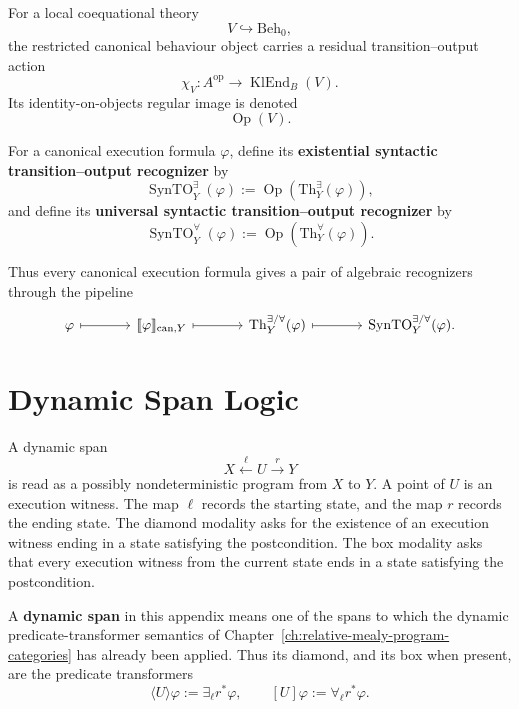 For a local coequational theory
\[
  V\hookrightarrow \mathrm{Beh}_0,
\]
the restricted canonical behaviour object carries a residual
transition--output action
\[
  \chi_V:A^{\mathrm{op}}\longrightarrow \operatorname{KlEnd}_B(V).
\]
Its identity-on-objects regular image is denoted
\[
  \operatorname{Op}(V).
\]

\begin{definition}
\label{def:syntactic-transition-output-recognizers}
For a canonical execution formula \(\varphi\), define its
\textbf{existential syntactic transition--output recognizer} by
\[
  \operatorname{SynTO}^{\exists}_Y(\varphi)
  :=
  \operatorname{Op}
  \left(
    \mathrm{Th}^{\exists}_Y(\varphi)
  \right),
\]
and define its \textbf{universal syntactic transition--output recognizer} by
\[
  \operatorname{SynTO}^{\forall}_Y(\varphi)
  :=
  \operatorname{Op}
  \left(
    \mathrm{Th}^{\forall}_Y(\varphi)
  \right).
\]
\end{definition}

Thus every canonical execution formula gives a pair of algebraic recognizers
through the pipeline
\[
\begin{tikzcd}[column sep=large]
\varphi
  \arrow[r, mapsto]
&
\llbracket\varphi\rrbracket_{\mathrm{can},Y}
  \arrow[r, mapsto]
&
\mathrm{Th}^{\exists/\forall}_Y(\varphi)
  \arrow[r, mapsto]
&
\operatorname{SynTO}^{\exists/\forall}_Y(\varphi).
\end{tikzcd}
\]

\section{Dynamic Span Logic}
\label{sec:dynamic-span-logic-formal}

A dynamic span
\[
  X\xleftarrow{\ell}U\xrightarrow{r}Y
\]
is read as a possibly nondeterministic program from \(X\) to \(Y\).  A point
of \(U\) is an execution witness.  The map \(\ell\) records the starting
state, and the map \(r\) records the ending state.  The diamond modality asks
for the existence of an execution witness ending in a state satisfying the
postcondition.  The box modality asks that every execution witness from the
current state ends in a state satisfying the postcondition.

\begin{definition}
\label{def:dynamic-span-recalled}
A \textbf{dynamic span} in this appendix means one of the spans to which the
dynamic predicate-transformer semantics of
Chapter~\ref{ch:relative-mealy-program-categories}
has already been applied.  Thus its diamond, and its box when present, are
the predicate transformers
\[
  \langle U\rangle\varphi
  :=
  \exists_{\ell}r^*\varphi,
  \qquad
  [U]\varphi
  :=
  \forall_{\ell}r^*\varphi.
\]
\end{definition}

